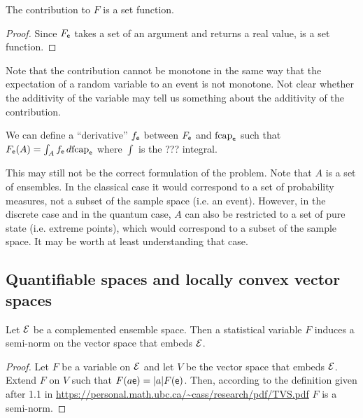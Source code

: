 \begin{prop}
	The contribution to $F$ is a set function.
\end{prop}

\begin{proof}
	Since $F_{\mathsf{e}}$ takes a set of an argument and returns a real value, is a set function.
\end{proof}

\begin{remark}
	Note that the contribution cannot be monotone in the same way that the expectation of a random variable to an event is not monotone. Not clear whether the additivity of the variable may tell us something about the additivity of the contribution.
\end{remark}

\begin{conj}
	We can define a ``derivative'' $f_{\mathsf{e}}$ between $F_{\mathsf{e}}$ and $\mathrm{fcap}_{\mathsf{e}}$ such that $F_{\mathsf{e}}(A) = \int_A f_{\mathsf{e}} \, d \mathrm{fcap}_{\mathsf{e}}$ where $\int$ is the ??? integral.
\end{conj}

\begin{remark}
	This may still not be the correct formulation of the problem. Note that $A$ is a set of ensembles. In the classical case it would correspond to a set of probability measures, not a subset of the sample space (i.e. an event). However, in the discrete case and in the quantum case, $A$ can also be restricted to a set of pure state (i.e. extreme points), which would correspond to a subset of the sample space. It may be worth at least understanding that case.
\end{remark}

\subsection{Quantifiable spaces and locally convex vector spaces}

\begin{prop}
	Let $\mathcal{E}$ be a complemented ensemble space. Then a statistical variable $F$ induces a semi-norm on the vector space that embeds $\mathcal{E}$.
\end{prop}

\begin{proof}
	Let $F$ be a variable on $\mathcal{E}$ and let $V$ be the vector space that embeds $\mathcal{E}$. Extend $F$ on $V$ such that $F(a\mathsf{e}) = |a| F(\mathsf{e})$. Then, according to the definition given after 1.1 in \url{https://personal.math.ubc.ca/~cass/research/pdf/TVS.pdf} $F$ is a semi-norm.
\end{proof}

